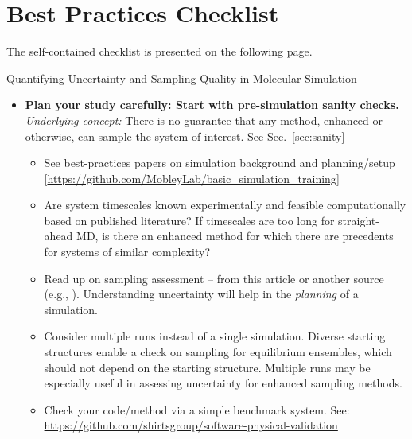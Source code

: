 \section{Best Practices Checklist}

The self-contained checklist is presented on the following page.

\begin{Checklists*}[p!]
\begin{checklist}{Quantifying Uncertainty and Sampling Quality in Molecular Simulation}
\begin{itemize}

\item
\textbf{Plan your study carefully: Start with pre-simulation sanity checks.}  \emph{Underlying concept:} There is no guarantee that any method, enhanced or otherwise, can sample the system of interest.  See Sec.\ \ref{sec:sanity}
    \begin{itemize}
    \item See best-practices papers on simulation background and planning/setup [\url{https://github.com/MobleyLab/basic_simulation_training}]
    \item Are system timescales known experimentally and feasible computationally based on published literature?
      If timescales are too long for straight-ahead MD, is there an enhanced method for which there are precedents for systems of similar complexity?
    \item Read up on sampling assessment -- from this article or another source (e.g., \cite{Grossfield2009}).  Understanding uncertainty will help in the \emph{planning} of a simulation.
    \item Consider multiple runs instead of a single simulation.  Diverse starting structures enable a check on sampling for equilibrium ensembles, which should not depend on the starting structure.  Multiple runs may be especially useful in assessing uncertainty for enhanced sampling methods.  
    \item Check your code/method via a simple benchmark system.  See: \url{https://github.com/shirtsgroup/software-physical-validation}
    \end{itemize}
    

\end{itemize}
\end{checklist}
\end{Checklists*}

